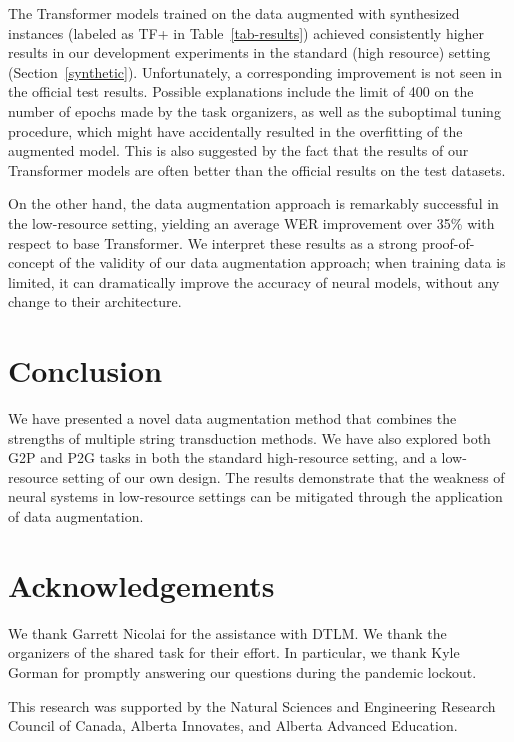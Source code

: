 \documentclass[11pt,a4paper]{article}
\newcommand{\tf}{TF}
\newcommand{\transformer}{{\sc Transformer}}
\begin{document}
The {\transformer} models trained on the data augmented 
with synthesized instances
(labeled as {\tf+} in Table~\ref{tab-results})
achieved consistently higher results in our development experiments
in the standard (high resource) setting
(Section~\ref{synthetic}).
Unfortunately, a corresponding improvement is not seen
in the official test results. 
Possible explanations include
the limit of 400 on the number of epochs made by the task organizers,
as well as the suboptimal tuning procedure,
which might have accidentally resulted 
in the overfitting of the augmented model.
This is also suggested by the fact that
the results of our {\transformer} models are often better 
than the official results on the test datasets.

On the other hand,
the data augmentation approach is remarkably successful 
in the low-resource setting,
yielding
an average WER improvement over 35\%  %
with respect to base {\transformer}.
We interpret these results
as a strong proof-of-concept of the validity of our 
data augmentation approach;
when training data is limited,
it can dramatically improve the accuracy of neural models,
without any change to their architecture.



\section{Conclusion}
\label{conclusion}


We have presented a novel data augmentation method
that combines the strengths of multiple string transduction methods.
We have also explored both G2P and P2G tasks
in both the standard high-resource setting,
and a low-resource setting of our own design.
The results demonstrate 
that the weakness of neural systems
in low-resource settings
can be mitigated through the application of data augmentation.


\section*{Acknowledgements}

We thank Garrett Nicolai for the assistance with DTLM.
We thank the organizers of the shared task for their effort.
In particular, 
we thank Kyle Gorman for promptly answering our questions
during the pandemic lockout.

This research was supported by
the Natural Sciences and Engineering Research Council of Canada,
Alberta Innovates, and Alberta Advanced Education.



\end{document}

